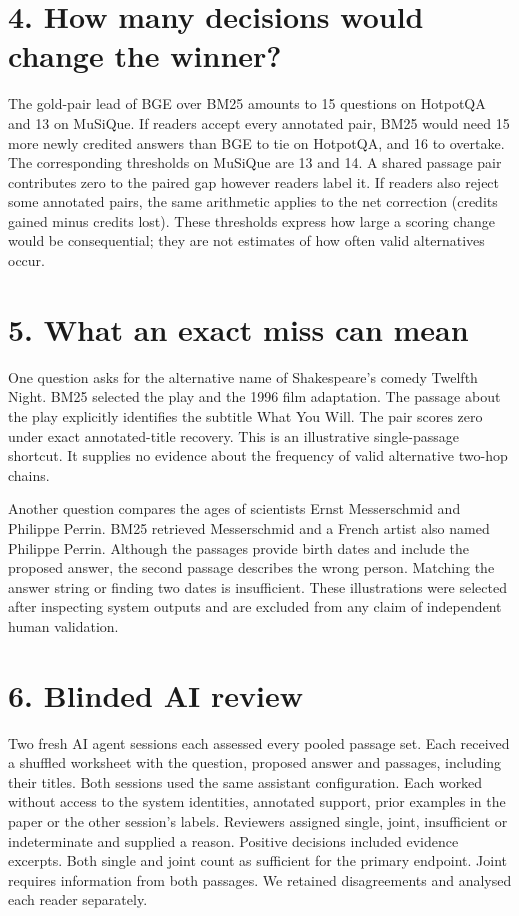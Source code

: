 \documentclass[11pt]{article}
\begin{document}
\section*{4. How many decisions would change the winner?}
The gold-pair lead of BGE over BM25 amounts to 15 questions on HotpotQA and 13 on MuSiQue. If readers accept every annotated pair, BM25 would need 15 more newly credited answers than BGE to tie on HotpotQA, and 16 to overtake. The corresponding thresholds on MuSiQue are 13 and 14. A shared passage pair contributes zero to the paired gap however readers label it. If readers also reject some annotated pairs, the same arithmetic applies to the net correction (credits gained minus credits lost). These thresholds express how large a scoring change would be consequential; they are not estimates of how often valid alternatives occur.

\section*{5. What an exact miss can mean}
One question asks for the alternative name of Shakespeare's comedy Twelfth Night. BM25 selected the play and the 1996 film adaptation. The passage about the play explicitly identifies the subtitle What You Will. The pair scores zero under exact annotated-title recovery. This is an illustrative single-passage shortcut. It supplies no evidence about the frequency of valid alternative two-hop chains.

Another question compares the ages of scientists Ernst Messerschmid and Philippe Perrin. BM25 retrieved Messerschmid and a French artist also named Philippe Perrin. Although the passages provide birth dates and include the proposed answer, the second passage describes the wrong person. Matching the answer string or finding two dates is insufficient. These illustrations were selected after inspecting system outputs and are excluded from any claim of independent human validation.

\section*{6. Blinded AI review}
Two fresh AI agent sessions each assessed every pooled passage set. Each received a shuffled worksheet with the question, proposed answer and passages, including their titles. Both sessions used the same assistant configuration. Each worked without access to the system identities, annotated support, prior examples in the paper or the other session's labels. Reviewers assigned single, joint, insufficient or indeterminate and supplied a reason. Positive decisions included evidence excerpts. Both single and joint count as sufficient for the primary endpoint. Joint requires information from both passages. We retained disagreements and analysed each reader separately.
\end{document}
